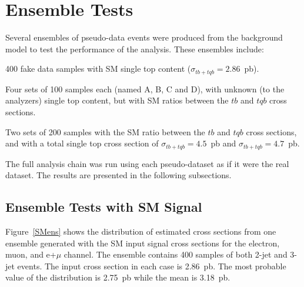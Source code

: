 \section{Ensemble Tests}
\label{sec:ensembles}

Several ensembles of pseudo-data events were produced from the
background model to test the performance of the analysis. These
ensembles include:
\vspace{-0.05in}
\begin{myenumerate}
\item 400 fake data samples with SM single top content
($\sigma_{tb+tqb}=2.86$~pb).
\item Four sets of 100 samples each (named A, B, C and D), with
unknown (to the analyzers) single top content, but with SM ratios
between the $tb$ and $tqb$ cross sections.
\item Two sets of 200 samples with the SM ratio between the $tb$ and
$tqb$ cross sections, and with a total single top cross section of
$\sigma_{tb+tqb}=4.5$~pb and $\sigma_{tb+tqb}=4.7$~pb.
\end{myenumerate}
\vspace{-0.05in}
The full analysis chain was run using each pseudo-dataset as if it
were the real dataset. The results are presented in the following
subsections.

\subsection{Ensemble Tests with SM Signal}
\label{ens_SM_sig}

Figure~\ref{SMens} shows the distribution of estimated cross sections
from one ensemble generated with the SM input signal cross sections
for the electron, muon, and e+$\mu$ channel. The ensemble contains 400
samples of both 2-jet and 3-jet events. The input cross section in
each case is 2.86~pb. The most probable value of the distribution is
2.75~pb while the mean is 3.18~pb.

